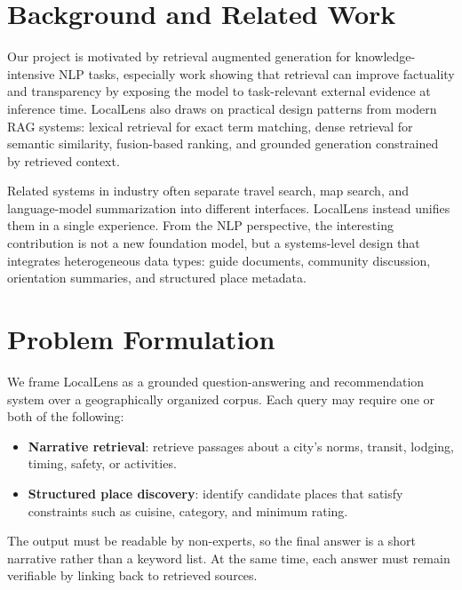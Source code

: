 \documentclass[11pt]{article}
\begin{document}
\section{Background and Related Work}
Our project is motivated by retrieval augmented generation for knowledge-intensive NLP tasks, especially work showing that retrieval can improve factuality and transparency by exposing the model to task-relevant external evidence at inference time. LocalLens also draws on practical design patterns from modern RAG systems: lexical retrieval for exact term matching, dense retrieval for semantic similarity, fusion-based ranking, and grounded generation constrained by retrieved context.

Related systems in industry often separate travel search, map search, and language-model summarization into different interfaces. LocalLens instead unifies them in a single experience. From the NLP perspective, the interesting contribution is not a new foundation model, but a systems-level design that integrates heterogeneous data types: guide documents, community discussion, orientation summaries, and structured place metadata.

\section{Problem Formulation}
We frame LocalLens as a grounded question-answering and recommendation system over a geographically organized corpus. Each query may require one or both of the following:
\begin{itemize}[leftmargin=*]
    \item \textbf{Narrative retrieval}: retrieve passages about a city's norms, transit, lodging, timing, safety, or activities.
    \item \textbf{Structured place discovery}: identify candidate places that satisfy constraints such as cuisine, category, and minimum rating.
\end{itemize}

The output must be readable by non-experts, so the final answer is a short narrative rather than a keyword list. At the same time, each answer must remain verifiable by linking back to retrieved sources.
\end{document}

